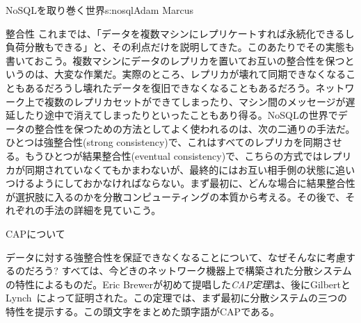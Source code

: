 \begin{aosachapter}{NoSQLを取り巻く世界}{s:nosql}{Adam Marcus}
\begin{aosasect1}{整合性}
これまでは、「データを複数マシンにレプリケートすれば永続化できるし負荷分散もできる」と、その利点だけを説明してきた。このあたりでその実態も書いておこう。複数マシンにデータのレプリカを置いてお互いの整合性を保つというのは、大変な作業だ。実際のところ、レプリカが壊れて同期できなくなることもあるだろうし壊れたデータを復旧できなくなることもあるだろう。ネットワーク上で複数のレプリカセットができてしまったり、マシン間のメッセージが遅延したり途中で消えてしまったりといったこともあり得る。NoSQLの世界でデータの整合性を保つための方法としてよく使われるのは、次の二通りの手法だ。ひとつは強整合性(strong consistency)で、これはすべてのレプリカを同期させる。もうひとつが結果整合性(eventual consistency)で、こちらの方式ではレプリカが同期されていなくてもかまわないが、最終的にはお互い相手側の状態に追いつけるようにしておかなければならない。まず最初に、どんな場合に結果整合性が選択肢に入るのかを分散コンピューティングの本質から考える。その後で、それぞれの手法の詳細を見ていこう。

\begin{aosasect2}{CAPについて}

データに対する強整合性を保証できなくなることについて、なぜそんなに考慮するのだろう? すべては、今どきのネットワーク機器上で構築された分散システムの特性によるものだ。Eric Brewerが初めて提唱した\emph{CAP定理}は、後にGilbertとLynch~\cite{bib:captheorem}によって証明された。この定理では、まず最初に分散システムの三つの特性を提示する。この頭文字をまとめた頭字語がCAPである。


\end{aosasect2}
\end{aosasect1}
\end{aosachapter}

